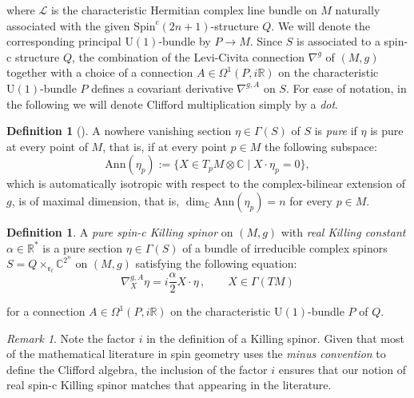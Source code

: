 \documentclass[10pt,a4paper,twoside,reqno]{amsart}
\theoremstyle{plain}
\theoremstyle{definition}
\newtheorem{definition}[thm]{Definition}
\theoremstyle{remark}
\newtheorem{remark}[thm]{Remark}
\def\C{\mathbb{C}}
\def\R{\mathbb{R}}
\def\U{\mathrm{U}}
\def\R{\mathbb{R}}
\begin{document}
\noindent
where $\mathcal{L}$ is the characteristic Hermitian complex line bundle on $M$ naturally associated with the given $\mathrm{Spin}^c(2n+1)$-structure $Q$. We will denote the corresponding principal $\U(1)$-bundle by $P\to M$. Since $S$ is associated to a spin-c structure $Q$, the combination of the Levi-Civita connection $\nabla^g$ of $(M,g)$ together with a choice of a connection $A\in\Omega^1(P,i\R)$ on the characteristic $\U(1)$-bundle $P$ defines a covariant derivative $\nabla^{g,A}$ on $S$. For ease of notation, in the following we will denote Clifford multiplication simply by a \emph{dot}.

\begin{definition}[{\cite[Chap.~IV, Sec.~9]{Spin89}}]
A nowhere vanishing section $\eta\in\Gamma(S)$ of $S$ is \emph{pure} if $\eta$ is pure at every point of $M$, that is, if at every point $p\in M$ the following subspace:
\begin{equation*}
\mathrm{Ann}(\eta_p):=\{X\in T_pM\otimes\C\mid X\cdot\eta_p=0\},
\end{equation*} 
which is automatically isotropic with respect to the complex-bilinear extension of $g$, is of maximal dimension, that is,  $\dim_\C\mathrm{Ann}(\eta_p)=n$ for every $p\in M$.
\end{definition}

\begin{definition} 
A \emph{pure spin-c Killing spinor} on $(M,g)$ with \emph{real Killing constant} $\alpha \in \mathbb{R}^{\ast}$ is a pure section $\eta\in \Gamma(S)$ of a bundle of irreducible complex spinors $S = Q  \times_{\mathfrak{r}_{\ell}} \C^{2^n}$ on $(M,g)$ satisfying the following equation:
\begin{equation}
\label{eq:KillingSpinor}
\nabla^{g,A}_X \eta = i\frac{\alpha}{2} X\cdot \eta\, , \qquad X \in \Gamma(TM)
\end{equation}

\noindent
for a connection $A\in\Omega^1(P,i\R)$ on the characteristic $\U(1)$-bundle $P$ of $Q$.
\end{definition}

\begin{remark}
Note the factor $i$ in the definition of a Killing spinor. Given that most of the mathematical literature in spin geometry uses the \emph{minus convention} to define the Clifford algebra, the inclusion of the factor $i$ ensures that our notion of real spin-c Killing spinor matches that appearing in the literature.
\end{remark}
\end{document}
